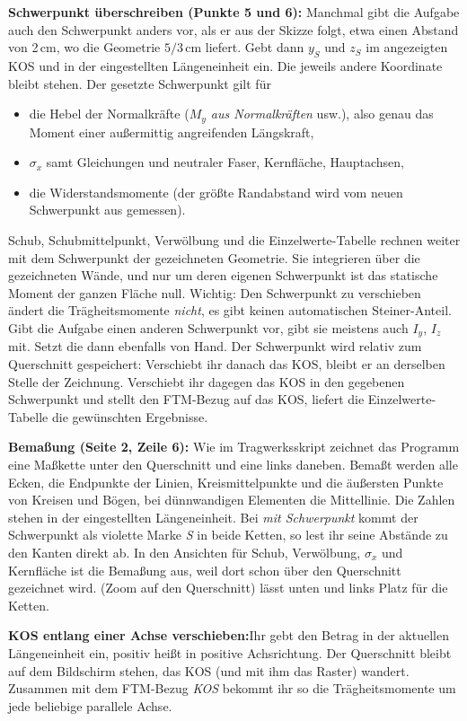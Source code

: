 \textbf{Schwerpunkt überschreiben (Punkte 5 und 6):} Manchmal gibt die Aufgabe auch den
Schwerpunkt anders vor, als er aus der Skizze folgt, etwa einen Abstand von 2\,cm, wo die Geometrie
$5/3$\,cm liefert. Gebt dann $y_S$ und $z_S$ im angezeigten KOS und in der eingestellten
Längeneinheit ein. Die jeweils andere Koordinate bleibt stehen. Der gesetzte Schwerpunkt gilt für
\begin{itemize}
  \item die Hebel der Normalkräfte (\emph{$M_y$ aus Normalkräften} usw.), also genau das Moment
        einer außermittig angreifenden Längskraft,
  \item $\sigma_x$ samt Gleichungen und neutraler Faser, Kernfläche, Hauptachsen,
  \item die Widerstandsmomente (der größte Randabstand wird vom neuen Schwerpunkt aus gemessen).
\end{itemize}
Schub, Schubmittelpunkt, Verwölbung und die Einzelwerte-Tabelle rechnen weiter mit dem
Schwerpunkt der gezeichneten Geometrie. Sie integrieren über die gezeichneten Wände, und nur um
deren eigenen Schwerpunkt ist das statische Moment der ganzen Fläche null. Wichtig: Den
Schwerpunkt zu verschieben ändert die Trägheitsmomente \emph{nicht}, es gibt keinen automatischen
Steiner-Anteil. Gibt die Aufgabe einen anderen Schwerpunkt vor, gibt sie meistens auch $I_y$, $I_z$
mit. Setzt die dann ebenfalls von Hand. Der Schwerpunkt wird relativ zum Querschnitt gespeichert:
Verschiebt ihr danach das KOS, bleibt er an derselben Stelle der Zeichnung.
Verschiebt ihr dagegen das KOS in den gegebenen Schwerpunkt und stellt den FTM-Bezug auf das KOS,
liefert die Einzelwerte-Tabelle die gewünschten Ergebnisse.

\textbf{Bemaßung (Seite 2, Zeile 6):} Wie im Tragwerksskript zeichnet das Programm eine
Maßkette unter den Querschnitt und eine links daneben. Bemaßt werden alle Ecken, die Endpunkte
der Linien, Kreismittelpunkte und die äußersten Punkte von Kreisen und Bögen, bei dünnwandigen
Elementen die Mittellinie. Die Zahlen stehen in der eingestellten Längeneinheit. Bei \emph{mit
Schwerpunkt} kommt der Schwerpunkt als violette Marke \emph{S} in beide Ketten, so lest ihr seine
Abstände zu den Kanten direkt ab. In den Ansichten für Schub,
Verwölbung, $\sigma_x$ und Kernfläche ist die Bemaßung aus, weil dort schon über den Querschnitt
gezeichnet wird.  (Zoom auf den Querschnitt) lässt unten und links Platz für die Ketten.

\textbf{KOS entlang einer Achse verschieben:}Ihr gebt den Betrag in der aktuellen Längeneinheit
ein, positiv heißt in positive Achsrichtung. Der Querschnitt bleibt auf dem Bildschirm stehen,
das KOS (und mit ihm das Raster) wandert. Zusammen mit dem FTM-Bezug \emph{KOS} bekommt ihr so
die Trägheitsmomente um jede beliebige parallele Achse.

